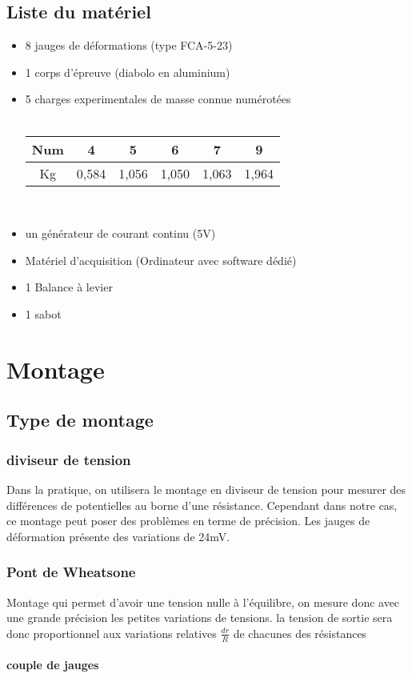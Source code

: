 \documentclass[10pt,a4paper]{report}
\begin{document}
\section{Liste du matériel}
\begin{itemize}
\item 8 jauges de déformations (type FCA-5-23)
\item 1 corps d'épreuve (diabolo en aluminium)
\item 5 charges experimentales de masse connue numérotées ~\\~\\
\begin{tabular}{|c|c|c|c|c|c|}
\hline 
Num & 4 & 5 & 6 & 7 & 9 \\ \hline
Kg    & 0,584 & 1,056 & 1,050 & 1,063 & 1,964 \\ \hline
\end{tabular}~\\
\item un générateur de courant continu (5V)
\item Matériel d'acquisition (Ordinateur avec software dédié)
\item 1 Balance à levier
\item 1 sabot
\end{itemize}
\chapter{Montage}
\section{Type de montage}
\subsection{diviseur de tension}
Dans la pratique, on utilisera le montage en diviseur de tension pour mesurer des différences de potentielles au borne d'une résistance. Cependant dans notre cas, ce montage peut poser des problèmes en terme de précision. Les jauges de déformation présente des variations de 24mV.
\subsection{Pont de Wheatsone}
Montage qui permet d'avoir une tension nulle à l'équilibre, on mesure donc avec une grande précision les petites variations de tensions. la tension de sortie sera donc proportionnel aux variations relatives $\frac{dr}{R}$ de chacunes des résistances
\subsubsection*{couple de jauges}
\end{document}

